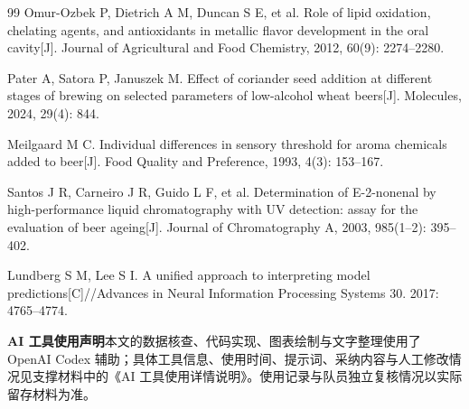 \begin{thebibliography}{99}
 Omur-Ozbek P, Dietrich A M, Duncan S E, et al. Role of lipid oxidation, chelating agents, and antioxidants in metallic flavor development in the oral cavity[J]. Journal of Agricultural and Food Chemistry, 2012, 60(9): 2274--2280.

 Pater A, Satora P, Januszek M. Effect of coriander seed addition at different stages of brewing on selected parameters of low-alcohol wheat beers[J]. Molecules, 2024, 29(4): 844.

 Meilgaard M C. Individual differences in sensory threshold for aroma chemicals added to beer[J]. Food Quality and Preference, 1993, 4(3): 153--167.

 Santos J R, Carneiro J R, Guido L F, et al. Determination of E-2-nonenal by high-performance liquid chromatography with UV detection: assay for the evaluation of beer ageing[J]. Journal of Chromatography A, 2003, 985(1--2): 395--402.

 Lundberg S M, Lee S I. A unified approach to interpreting model predictions[C]//Advances in Neural Information Processing Systems 30. 2017: 4765--4774.

\end{thebibliography}

\vspace{1em}
\noindent\textbf{AI 工具使用声明}\quad 本文的数据核查、代码实现、图表绘制与文字整理使用了 OpenAI Codex 辅助；具体工具信息、使用时间、提示词、采纳内容与人工修改情况见支撑材料中的《AI 工具使用详情说明》。使用记录与队员独立复核情况以实际留存材料为准。
